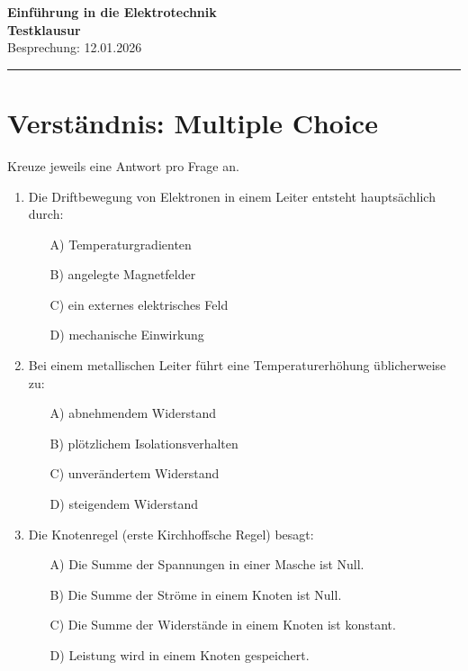 \documentclass[a4paper,12pt]{article}
\newif\ifshowsolutions
\begin{document}
\begin{center}
  {\LARGE\bfseries Einführung in die Elektrotechnik \\[6pt] Testklausur}\\[12pt]
  {\large Besprechung: 12.01.2026}\\[6pt]
  \rule{\textwidth}{0.4pt}
\end{center}

\section{Verständnis: Multiple Choice}

Kreuze jeweils eine Antwort pro Frage an.

\vspace{8pt}

\begin{enumerate}[label=\textbf{\arabic*.}, leftmargin=*, itemsep=8pt]

  \item Die Driftbewegung von Elektronen in einem Leiter entsteht hauptsächlich durch:
    \begin{itemize}[label=$\square$]
      \item[A)] Temperaturgradienten
      \item[B)] angelegte Magnetfelder
      \item[C)] ein externes elektrisches Feld
      \item[D)] mechanische Einwirkung
    \end{itemize}

\ifshowsolutions
Lösung: C
\fi

  \item Bei einem metallischen Leiter führt eine Temperaturerhöhung üblicherweise zu:
    \begin{itemize}[label=$\square$]
      \item[A)] abnehmendem Widerstand
      \item[B)] plötzlichem Isolationsverhalten
      \item[C)] unverändertem Widerstand
      \item[D)] steigendem Widerstand
    \end{itemize}

\ifshowsolutions
Lösung: D
\fi

  \item Die Knotenregel (erste Kirchhoffsche Regel) besagt:
    \begin{itemize}[label=$\square$]
      \item[A)] Die Summe der Spannungen in einer Masche ist Null.
      \item[B)] Die Summe der Ströme in einem Knoten ist Null.
      \item[C)] Die Summe der Widerstände in einem Knoten ist konstant.
      \item[D)] Leistung wird in einem Knoten gespeichert.
    \end{itemize}


\end{enumerate}
\end{document}
